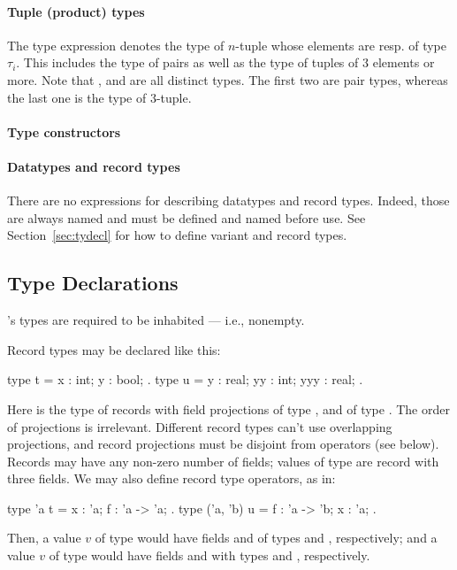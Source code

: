 \paragraph{Tuple (product) types}
The type expression  denotes the
type of $n$-tuple whose elements are resp. of type $\tau_i$. This
includes the type of pairs as well as the type of tuples of $3$ elements
or more.
%
Note that ,  and
 are all distinct types. The first two
are pair types, whereas the last one is the type of $3$-tuple.

\paragraph{Type constructors}

\paragraph{Datatypes and record types}

There are no expressions for describing datatypes and record types. Indeed,
those are always named and must be defined and named before use. See
Section~\ref{sec:tydecl} for how to define variant and record types.

\subsection{Type Declarations}

\EasyCrypt's types are required to be inhabited --- i.e., nonempty.

Record types may be declared like this:
\begin{easycrypt}{}{}
type t = { x : int; y : bool; }.
type u = { y : real; yy : int; yyy : real; }.
\end{easycrypt}
Here  is the type of records with field projections  of
type , and  of type . The order of projections
is irrelevant.  Different record types can't use overlapping
projections, and record projections must be disjoint from operators
(see below). Records may have any non-zero number of fields; values of
type  are record with three fields. We may also define record
type operators, as in:
\begin{easycrypt}{}{}
type 'a t = { x : 'a; f : 'a -> 'a; }.
type ('a, 'b) u = { f : 'a -> 'b; x : 'a; }.
\end{easycrypt}
Then, a value $v$ of type  would have fields  and
 of types  and , respectively; and
a value $v$ of type  would have fields  and
 with types  and , respectively.

